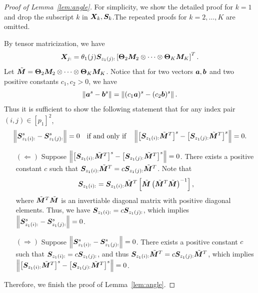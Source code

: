 \documentclass[lettersize,onecolumn,journal]{IEEEtran}
\theoremstyle{definition}
\theoremstyle{definition}
\newcommand{\of}[1]{\left(#1\right)}
\newcommand{\off}[1]{\left[#1\right]}
\begin{document}
\begin{proof}[Proof of Lemma~\ref{lem:angle}] For simplicity, we show the detailed proof for $k = 1$ and drop the subscript $k$ in $\bm X_k, \bm S_k$.The repeated proofs for $k = 2, \ldots, K$ are omitted. 

By tensor matricization, we have
\begin{equation}
    \mX_{j:} = \theta_1(j) \mS_{z_1(j):} \off{\mTheta_2 \mM_2 \otimes \cdots \otimes \mTheta_K \mM_K}^T.
\end{equation}     
Let $\tilde {\bm M} = \boldsymbol{\Theta}_2 \bm M_2 \otimes \cdots \otimes \boldsymbol{\Theta}_K \bm M_K$. Notice that for two vectors $\bm{a}, \bm{b}$ and two positive constants $c_1, c_2 >0$, we have
\begin{equation}
\left\lVert\bm{a}^s - \bm{b}^s\right\rVert = \left\lVert(c_1 \bm{a})^s - (c_2\bm{b})^s\right\rVert.
\end{equation}
Thus it is sufficient to show the following statement that for any index pair $(i,j)\in[p_1]^2$,
\begin{equation}
\onorm{ \mS_{z_1(i):}^s - \mS_{z_1(j):}^s} = 0 \quad \text{if and only if} \quad \onorm{ \off{\mS_{z_1(i):} \tilde \mM^T }^s - \off{\mS_{z_1(j):}\tilde \mM^T}^s} = 0.
\end{equation}
\begin{enumerate}
    \item[$(\Leftarrow)$] Suppose $\onorm{ \off{\mS_{z_1(i):} \tilde \mM^T }^s - \off{\mS_{z_1(j):}\tilde \mM^T}^s} = 0$. There exists a positive constant $c$ such that $\bm S_{z_1(i):} \tilde {\bm M}^T= c \bm S_{z_1(j):} \tilde {\bm M}^T$. Note that
\begin{equation}
    \mS_{z_1(i):} = \mS_{z_1(i):} \tilde \mM^T \off{ \tilde \mM \of{ \tilde \mM^T  \tilde \mM}^{-1}},
\end{equation}
where $ \tilde {\bm M}^T  \tilde {\bm M}$ is an invertiable diagonal matrix with positive diagonal elements. Thus, we have $ \bm S_{z_1(i):} = c  \bm S_{z_1(j):}$, which implies $ \left\lVert  \bm S_{z_1(i):}^s -  \bm S_{z_1(j):}^s \right\rVert = 0 $.

\item[$(\Rightarrow)$] Suppose $ \left\lVert \bm S_{z_1(i):}^s - \bm S_{z_1(j):}^s \right\rVert = 0 $. There exists a positive constant $c$ such that $\bm S_{z_1(i):} = c \bm S_{z_1(j):}$, and thus $\bm S_{z_1(i):} \tilde {\bm M}^T = c \bm S_{z_1(j):} \tilde {\bm M}^T$, which implies $\left\lVert\left[\bm S_{z_1(i):} \tilde {\bm M}^T\right]^s- \left[\bm S_{z_1(j):} \tilde {\bm M}^T\right]^s\right\rVert=0$.
\end{enumerate}
Therefore, we finish the proof of Lemma~\ref{lem:angle}.
\end{proof}
\end{document}

